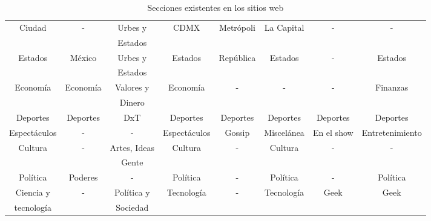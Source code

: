 \begin{table}[H]
{\begin{tabular}[H]{|c|c|c|c|c|c|c|c|}
        Ciudad & - & Urbes y & CDMX & Metrópoli & La Capital& - & -\\ 
         &  & Estados & & & & & \\
        \hline

        Estados & México & Urbes y & Estados & República & Estados & - & Estados\\ 
         &  & Estados & & & & & \\
        \hline

        Economía & Economía & Valores y & Economía & - & - & - & Finanzas\\ 
         &  & Dinero & & & & & \\
        \hline

        Deportes & Deportes & DxT & Deportes & Deportes & Deportes & Deportes & Deportes\\ 
        \hline

        Espectáculos & - & - & Espectáculos & Gossip & Miscelánea &  En el show & Entretenimiento\\ 
        \hline

        Cultura & - & Artes, Ideas & Cultura & - & Cultura & - & -\\ 
         &  & Gente & & & & &\\ 
        \hline

        Política & Poderes & - & Política & - & Política & - & Política\\ 
        \hline

        Ciencia y & - & Política y & Tecnología & - & Tecnología  & Geek & Geek\\ 
        tecnología &  & Sociedad & & & & &  \\ 
        \hline        

    \end{tabular}%
}
\caption[Secciones de los sitios web]{Secciones existentes en los sitios web}
\label{tabla:sitiosW}
\end{table}

